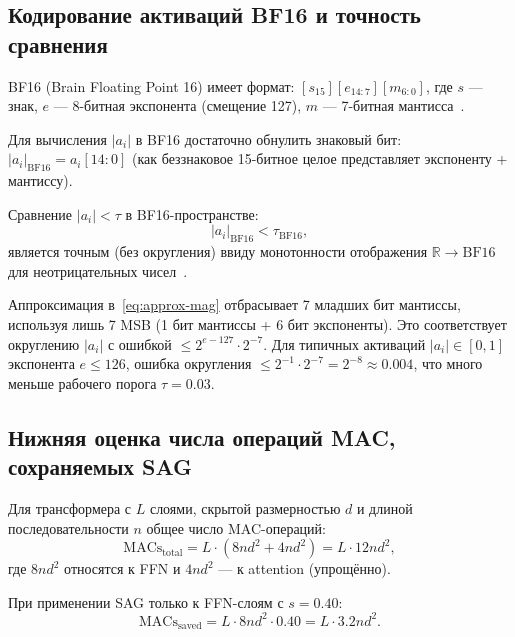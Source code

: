 \subsection{Кодирование активаций BF16 и точность сравнения}
\label{ssec:glava87-bf16}

BF16 (Brain Floating Point 16) имеет формат:
$[s_{15}][e_{14:7}][m_{6:0}]$,
где $s$ — знак, $e$ — 8-битная экспонента (смещение 127),
$m$ — 7-битная мантисса~\cite{muller_fp_handbook}.

Для вычисления $|a_i|$ в BF16 достаточно обнулить знаковый бит:
$|a_i|_{\mathrm{BF16}} = a_i[14:0]$ (как беззнаковое 15-битное
целое представляет экспоненту + мантиссу).

Сравнение $|a_i| < \tau$ в BF16-пространстве:
\begin{equation}
  |a_i|_{\mathrm{BF16}} < \tau_{\mathrm{BF16}},
  \label{eq:bf16-compare}
\end{equation}
является точным (без округления) ввиду монотонности отображения
$\mathbb{R} \to \text{BF16}$ для неотрицательных чисел~\cite{muller_fp_handbook}.

Аппроксимация в~\eqref{eq:approx-mag} отбрасывает 7 младших бит мантиссы,
используя лишь 7 MSB (1 бит мантиссы + 6 бит экспоненты).
Это соответствует округлению $|a_i|$ с ошибкой $\leq 2^{e-127} \cdot 2^{-7}$.
Для типичных активаций $|a_i| \in [0, 1]$ экспонента $e \leq 126$,
ошибка округления $\leq 2^{-1} \cdot 2^{-7} = 2^{-8} \approx 0{.}004$,
что много меньше рабочего порога $\tau = 0{.}03$.

\subsection{Нижняя оценка числа операций MAC, сохраняемых SAG}
\label{ssec:glava87-mac-count}

Для трансформера с $L$ слоями, скрытой размерностью $d$ и
длиной последовательности $n$ общее число MAC-операций:
\begin{equation}
  \text{MACs}_{\text{total}} = L \cdot (8 n d^2 + 4 n d^2)
  = L \cdot 12 n d^2,
  \label{eq:mac-total}
\end{equation}
где $8 n d^2$ относятся к FFN и $4 n d^2$ — к attention (упрощённо).

При применении SAG только к FFN-слоям с $s = 0{.}40$:
\begin{equation}
  \text{MACs}_{\text{saved}} = L \cdot 8 n d^2 \cdot 0{.}40
  = L \cdot 3{.}2 n d^2.
  \label{eq:mac-saved}
\end{equation}

